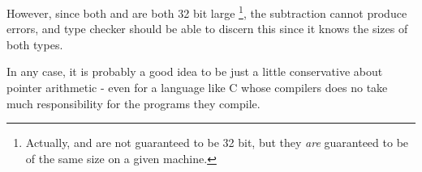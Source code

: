\medskip

However, since both  and  are both 32 bit large
\footnote{Actually,  and  are not guaranteed to be 32 bit,
but they \textit{are} guaranteed to be of the same size on a given machine.},
the subtraction cannot produce errors, and type checker should be able to
discern this since it knows the sizes of both types.

\medskip

In any case, it is probably a good idea to be just a little conservative about
pointer arithmetic - even for a language like C whose compilers does no take
much responsibility for the programs they compile.

\Sectend
